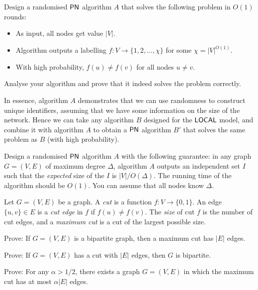\begin{ex}
    Design a randomised $\textup{\sffamily PN}$ algorithm $A$ that solves the following problem in $O(1)$ rounds:
    \begin{itemize}[noitemsep]
        \item As input, all nodes get value $|V|$.
        \item Algorithm outputs a labelling $f\colon V \to \{1,2,\dotsc,\chi\}$ for some $\chi = |V|^{O(1)}$.
        \item With high probability, $f(u) \ne f(v)$ for all nodes $u \ne v$.
    \end{itemize}
    Analyse your algorithm and prove that it indeed solves the problem correctly.

    In essence, algorithm $A$ demonstrates that we can use randomness to construct unique identifiers, assuming that we have some information on the size of the network. Hence we can take any algorithm $B$ designed for the $\textup{\sffamily LOCAL}$ model, and combine it with algorithm $A$ to obtain a $\textup{\sffamily PN}$ algorithm $B'$ that solves the same problem as $B$ (with high probability).
\end{ex}

\begin{ex}
    Design a randomised $\textup{\sffamily PN}$ algorithm $A$ with the following guarantee: in any graph $G = (V,E)$ of maximum degree $\Delta$, algorithm $A$ outputs an independent set $I$ such that the \emph{expected} size of the $I$ is $|V|/O(\Delta)$. The running time of the algorithm should be $O(1)$. You can assume that all nodes know $\Delta$.
\end{ex}

\begin{ex}
    Let $G = (V,E)$ be a graph. A \emph{cut} is a function $f\colon V \to \{0,1\}$. An edge $\{u,v\} \in E$ is a \emph{cut edge} in $f$ if $f(u) \ne f(v)$. The \emph{size} of cut $f$ is the number of cut edges, and a \emph{maximum cut} is a cut of the largest possible size.
    \begin{subex}
        \item Prove: If $G = (V,E)$ is a bipartite graph, then a maximum cut has $|E|$ edges.
        \item Prove: If $G = (V,E)$ has a cut with $|E|$ edges, then $G$ is bipartite.
        \item Prove: For any $\alpha > 1/2$, there exists a graph $G = (V,E)$ in which the maximum cut has at most $\alpha |E|$ edges.
    \end{subex}
\end{ex}

